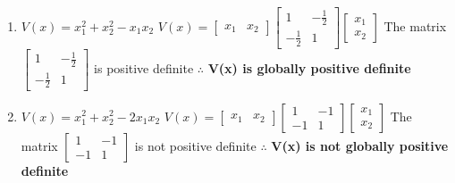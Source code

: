 \documentclass{article}
\begin{document}
\begin{enumerate}[label=(\roman*)]
    \item $V(x) = x_1^2 + x_2^2 - x_1x_2$ \newline \newline
       $V(x) = \begin{bmatrix}
                x_1 & x_2
              \end{bmatrix}
              \begin{bmatrix}
                1 & -\frac{1}{2} \\
                -\frac{1}{2} & 1
              \end{bmatrix}
              \begin{bmatrix}
                x_1 \\
                x_2
              \end{bmatrix}$
      The matrix $\begin{bmatrix}
                1 & -\frac{1}{2} \\
                -\frac{1}{2} & 1
              \end{bmatrix}$ is positive definite \newline \newline
      $\therefore$ \textbf{V(x) is globally positive definite} \newline
 
   \item $V(x) = x_1^2 + x_2^2 - 2x_1x_2$ \newline \newline
       $V(x) = \begin{bmatrix}
                x_1 & x_2
              \end{bmatrix}
              \begin{bmatrix}
                1 & -1 \\
                -1 & 1
              \end{bmatrix}
              \begin{bmatrix}
                x_1 \\
                x_2
              \end{bmatrix}$
      The matrix $\begin{bmatrix}
                1 & -1 \\
                -1 & 1
              \end{bmatrix}$ is not positive definite \newline \newline
      $\therefore$ \textbf{V(x) is not globally positive definite} \newline
 

\end{enumerate}
\end{document}

